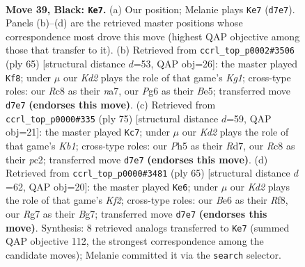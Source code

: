 \documentclass[11pt]{article}
\begin{document}
\clearpage

\begin{figure}[p]\centering
\begin{subfigure}{0.46\textwidth}\centering
\resizebox{\linewidth}{!}{%
\newchessgame
\chessboard[
  setfen={2r5/p1pk2r1/P1p1b1p1/2P2p1p/1P3P1P/6R1/8/RN2K3 b Q - 1 39},
  showmover=false,
  pgfstyle=straightmove, color=movearrow, markmove={d7-e7}
]}
\caption{}
\end{subfigure}\hfill
\begin{subfigure}{0.46\textwidth}\centering
\resizebox{\linewidth}{!}{%
\newchessgame
\chessboard[
  setfen={4r1k1/N4ppp/3p4/p2PbP1P/8/1P6/2P5/1K2R3 b - - 2 33},
  showmover=false,
  pgfstyle=straightmove, color=movearrow, markmove={g8-f8}
]}
\caption{}
\end{subfigure}
\\[4pt]
\begin{subfigure}{0.46\textwidth}\centering
\resizebox{\linewidth}{!}{%
\newchessgame
\chessboard[
  setfen={1k5r/pp1r2p1/3p1p2/PP1RpP2/4P2P/7R/1KP5/8 b - - 0 38},
  showmover=false,
  pgfstyle=straightmove, color=movearrow, markmove={b8-c7}
]}
\caption{}
\end{subfigure}\hfill
\begin{subfigure}{0.46\textwidth}\centering
\resizebox{\linewidth}{!}{%
\newchessgame
\chessboard[
  setfen={5r2/5kb1/2p3p1/1p2p1p1/pP2P1N1/2P2P2/P7/1K5R b - - 2 33},
  showmover=false,
  pgfstyle=straightmove, color=movearrow, markmove={f7-e6}
]}
\caption{}
\end{subfigure}
\caption{\textbf{Move 39, Black: \texttt{Ke7}.} (a) Our position; Melanie plays \texttt{Ke7} (\texttt{d7e7}). Panels (b)--(d) are the retrieved master positions whose correspondence most drove this move (highest QAP objective among those that transfer to it). (b) Retrieved from \texttt{ccrl\_top\_p0002\#3506} (ply 65) [structural distance $d$=53, QAP obj=26]: the master played \texttt{Kf8}; under $\mu$ our \emph{Kd2} plays the role of that game's \emph{Kg1}; cross-type roles: our \emph{R}c8 as their \emph{n}a7, our \emph{P}g6 as their \emph{B}e5; transferred move \texttt{d7e7} \textbf{(endorses this move)}. (c) Retrieved from \texttt{ccrl\_top\_p0000\#335} (ply 75) [structural distance $d$=59, QAP obj=21]: the master played \texttt{Kc7}; under $\mu$ our \emph{Kd2} plays the role of that game's \emph{Kb1}; cross-type roles: our \emph{P}h5 as their \emph{R}d7, our \emph{R}c8 as their \emph{p}c2; transferred move \texttt{d7e7} \textbf{(endorses this move)}. (d) Retrieved from \texttt{ccrl\_top\_p0000\#3481} (ply 65) [structural distance $d$=62, QAP obj=20]: the master played \texttt{Ke6}; under $\mu$ our \emph{Kd2} plays the role of that game's \emph{Kf2}; cross-type roles: our \emph{B}e6 as their \emph{R}f8, our \emph{R}g7 as their \emph{B}g7; transferred move \texttt{d7e7} \textbf{(endorses this move)}. Synthesis: 8 retrieved analogs transferred to \texttt{Ke7} (summed QAP objective 112, the strongest correspondence among the candidate moves); Melanie committed it via the \texttt{search} selector.}
\label{fig:thought-m77}
\end{figure}
\end{document}
